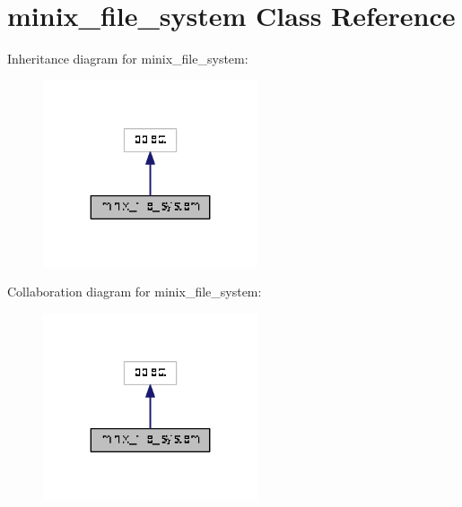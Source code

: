 \hypertarget{classminixfs_1_1minix__file__system}{}\section{minix\+\_\+file\+\_\+system Class Reference}
\label{classminixfs_1_1minix__file__system}


Inheritance diagram for minix\+\_\+file\+\_\+system\+:
\nopagebreak
\begin{figure}[H]
\begin{center}
\leavevmode
\includegraphics[width=179pt]{classminixfs_1_1minix__file__system__inherit__graph}
\end{center}
\end{figure}


Collaboration diagram for minix\+\_\+file\+\_\+system\+:
\nopagebreak
\begin{figure}[H]
\begin{center}
\leavevmode
\includegraphics[width=179pt]{classminixfs_1_1minix__file__system__coll__graph}
\end{center}
\end{figure}

